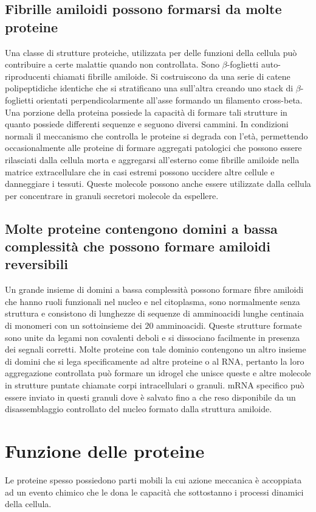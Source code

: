 \subsection{Fibrille amiloidi possono formarsi da molte proteine}
Una classe di strutture proteiche, utilizzata per delle funzioni della cellula pu\`o contribuire a certe malattie quando non controllata. Sono $\beta$-foglietti auto-riproducenti chiamati
fibrille amiloide. Si costruiscono da una serie di catene polipeptidiche identiche che si stratificano una sull'altra creando uno stack di $\beta$-foglietti orientati perpendicolarmente
all'asse formando un filamento cross-beta. Una porzione della proteina possiede la capacit\`a di formare tali strutture in quanto possiede differenti sequenze e seguono diversi cammini. 
In condizioni normali il meccanismo che controlla le proteine si degrada con l'et\`a, permettendo occasionalmente alle proteine di formare aggregati patologici che possono essere 
rilasciati dalla cellula morta e aggregarsi all'esterno come fibrille amiloide nella matrice extracellulare che in casi estremi possono uccidere altre cellule e danneggiare i tessuti.
Queste molecole possono anche essere utilizzate dalla cellula per concentrare in granuli secretori molecole da espellere. 
\subsection{Molte proteine contengono domini a bassa complessit\`a che possono formare amiloidi reversibili}
Un grande insieme di domini a bassa complessit\`a possono formare fibre amiloidi che hanno ruoli funzionali nel nucleo e nel citoplasma, sono normalmente senza struttura e consistono
di lunghezze di sequenze di amminoacidi lunghe centinaia di monomeri con un sottoinsieme dei $20$ amminoacidi. Queste strutture formate sono unite da legami non covalenti deboli e si
dissociano facilmente in presenza dei segnali corretti. Molte proteine con tale dominio contengono un altro insieme di domini che si lega specificamente ad altre proteine o al RNA, 
pertanto la loro aggregazione controllata pu\`o formare un idrogel che unisce queste e altre molecole in strutture puntate chiamate corpi intracellulari o granuli. mRNA specifico pu\`o
essere inviato in questi granuli dove \`e salvato fino a che reso disponibile da un disassemblaggio controllato del nucleo formato dalla struttura amiloide. 
\section{Funzione delle proteine}
Le proteine spesso possiedono parti mobili la cui azione meccanica \`e accoppiata ad un evento chimico che le dona le capacit\`a che sottostanno i processi dinamici della cellula. 
